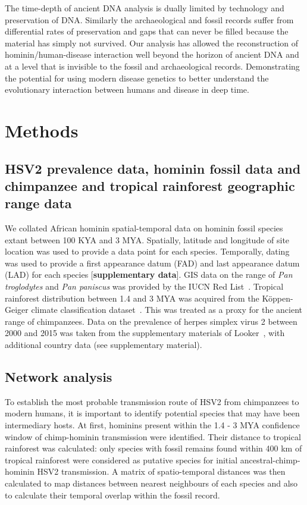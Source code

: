 \documentclass[fleqn,10pt]{wlscirep}
\begin{document}
The time-depth of ancient DNA analysis is dually limited by technology and preservation of DNA. Similarly the archaeological and fossil records suffer from differential rates of preservation and gaps that can never be filled because the material has simply not survived.  Our analysis has allowed the reconstruction of hominin/human-disease interaction well beyond the horizon of ancient DNA and at a level that is invisible to the fossil and archaeological records. Demonstrating the potential for using modern disease genetics to better understand the evolutionary interaction between humans and disease in deep time.

\section*{Methods}
\subsection*{HSV2 prevalence data, hominin fossil data and chimpanzee and tropical rainforest geographic range data}

We collated African hominin spatial-temporal data on hominin fossil species extant between 100 KYA and 3 MYA. Spatially, latitude and longitude of site location was used to provide a data point for each species. Temporally, dating was used to provide a first appearance datum (FAD) and last appearance datum (LAD) for each species [\textbf{supplementary data}]. GIS data on the range of \textit{Pan troglodytes} and \textit{Pan paniscus} was provided by the IUCN Red List~\cite{Oates2008}. Tropical rainforest distribution between 1.4 and 3 MYA was acquired from the K\"{o}ppen-Geiger climate classification dataset~\cite{Peel2007}. This was treated as a proxy for the ancient range of chimpanzees. Data on the prevalence of herpes simplex virus 2 between 2000 and 2015 was taken from the supplementary materials of Looker~\cite{Looker2015}, with additional country data (see supplementary material). 

\subsection*{Network analysis}

To establish the most probable transmission route of HSV2 from chimpanzees to modern humans, it is important to identify potential species that may have been intermediary hosts. At first, hominins present within the 1.4 - 3 MYA confidence window of chimp-hominin transmission were identified. Their distance to tropical rainforest was calculated: only species with fossil remains found within 400 km of tropical rainforest were considered as putative species for initial ancestral-chimp-hominin HSV2 transmission. A matrix of spatio-temporal distances was then calculated to map distances between nearest neighbours of each species and also to calculate their temporal overlap within the fossil record. 
\end{document}
